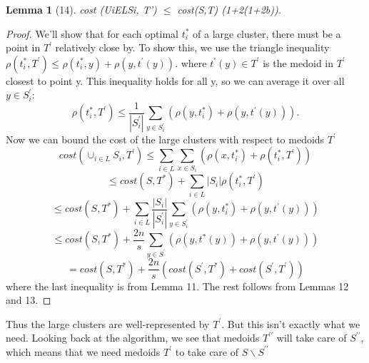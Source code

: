 \documentclass[letterpaper,10pt]{article}
\theoremstyle{plain}
\newtheorem{lemma}{Lemma}
\begin{document}
\begin{lemma}[14]
cost (UiELSi, T') $\le$ cost(S,T) (1+2(1+2b)). 
\end{lemma}
\begin{proof}
We'll show that for each optimal $t_{i}^{*}$ of a large cluster, there must be a point in $T^{\prime}$ relatively close by.  To show this, we use the triangle inequality $\rho(t_{i}^{*},T^{\prime})\le\rho(t_{i}^{*},y)+\rho(y,t^{\prime}(y)).$  where $t^{\prime}(y)\in T^{\prime}$ is the medoid in $T^{\prime}$ closest to point y.  This inequality holds for all y, so we can average it over all $y\in S_{i}^{\prime}$: 
\[
\rho(t_{i}^{*},T^{\prime})\le\frac{1}{|S_{i}^{\prime}|}\sum_{y\in S_{i}^{\prime}}(\rho(y,t_{i}^{*})+\rho(y,t^{\prime}(y))).
\]
Now we can bound the cost of the large clusters with respect to medoids $T^{\prime}$ 
\[
cost(\cup_{i\in L}S_{i},T^{\prime})\le\sum_{i\in L}\sum_{x\in S_{i}}(\rho(x,t_{i}^{*})+\rho(t_{i}^{*},T^{\prime}))
\]
\[
\le cost(S,T^{*})+\sum_{i\in L}|S_{i}|\rho(t_{i}^{*},T^{\prime})
\]
\[
\le cost(S,T^{*})+\sum_{i\in L}\frac{|S_{i}|}{|S_{i}^{\prime}|}\sum_{y\in S_{i}^{\prime}}(\rho(y,t_{i}^{*})+\rho(y,t^{\prime}(y)))
\]
\[
\le cost(S,T^{*})+\frac{2n}{s}\sum_{y\in S^{\prime}}(\rho(y,t^{*}(y))+\rho(y,t^{\prime}(y)))
\]
\[
=cost(S,T^{*})+\frac{2n}{s}(cost(S^{\prime},T^{*})+cost(S^{\prime},T^{\prime}))
\]
where the last inequality is from Lemma 11.  The rest follows from Lemmas 12 and 13. 
\end{proof}

Thus the large clusters are well-represented by $T^{\prime}$.  But this isn't exactly what we need.  Looking back at the algorithm, we see that medoids $T^{\prime\prime}$ will take care of $S^{\prime\prime}$, which means that we need medoids $T^{\prime}$ to take care of $S\backslash S^{\prime\prime}$ 
\end{document}
